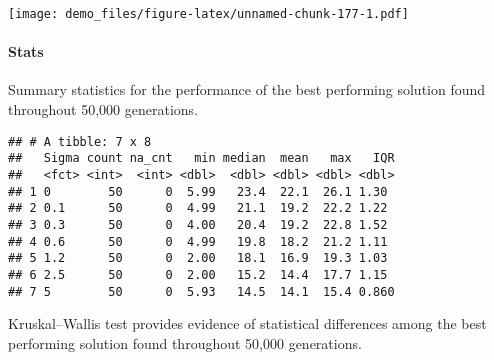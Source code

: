 \documentclass[]{book}
\newenvironment{Shaded}{\begin{snugshade}}{\end{snugshade}}
\newcommand{\DataTypeTok}[1]{\textcolor[rgb]{0.13,0.29,0.53}{#1}}
\newcommand{\KeywordTok}[1]{\textcolor[rgb]{0.13,0.29,0.53}{\textbf{#1}}}
\newcommand{\NormalTok}[1]{#1}
\newcommand{\OperatorTok}[1]{\textcolor[rgb]{0.81,0.36,0.00}{\textbf{#1}}}
\newcommand{\OtherTok}[1]{\textcolor[rgb]{0.56,0.35,0.01}{#1}}
\newcommand{\StringTok}[1]{\textcolor[rgb]{0.31,0.60,0.02}{#1}}
\let\oldparagraph\paragraph
\renewcommand{\paragraph}[1]{\oldparagraph{#1}\mbox{}}
\begin{document}
\texttt{[image: demo\_files/figure-latex/unnamed-chunk-177-1.pdf]}

\hypertarget{stats-34}{%
\paragraph{Stats}\label{stats-34}}

Summary statistics for the performance of the best performing solution found throughout 50,000 generations.

\begin{Shaded}
\end{Shaded}

\begin{verbatim}
## # A tibble: 7 x 8
##   Sigma count na_cnt   min median  mean   max   IQR
##   <fct> <int>  <int> <dbl>  <dbl> <dbl> <dbl> <dbl>
## 1 0        50      0  5.99   23.4  22.1  26.1 1.30 
## 2 0.1      50      0  4.99   21.1  19.2  22.2 1.22 
## 3 0.3      50      0  4.00   20.4  19.2  22.8 1.52 
## 4 0.6      50      0  4.99   19.8  18.2  21.2 1.11 
## 5 1.2      50      0  2.00   18.1  16.9  19.3 1.03 
## 6 2.5      50      0  2.00   15.2  14.4  17.7 1.15 
## 7 5        50      0  5.93   14.5  14.1  15.4 0.860
\end{verbatim}

Kruskal--Wallis test provides evidence of statistical differences among the best performing solution found throughout 50,000 generations.
\end{document}
